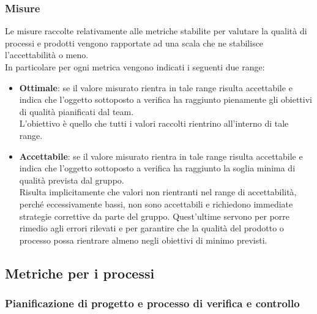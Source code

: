 		\subsubsection{Misure}
		Le misure raccolte relativamente alle metriche stabilite per valutare la qualità di processi e prodotti vengono rapportate ad una scala che ne stabilisce l'accettabilità o meno. \\In particolare per ogni metrica vengono indicati i seguenti due range:
			\begin{itemize}
				\item \textbf{Ottimale}: se il valore misurato rientra in tale range risulta accettabile e indica che l'oggetto sottoposto a verifica ha raggiunto pienamente gli obiettivi di qualità pianificati dal team. \\L'obiettivo è quello che tutti i valori raccolti rientrino all'interno di tale range.
				\item \textbf{Accettabile}: se il valore misurato rientra in tale range risulta accettabile e indica che l'oggetto sottoposto a verifica ha raggiunto la soglia minima di qualità prevista dal gruppo.
			\\Risulta implicitamente che valori non rientranti nel range di accettabilità, perché eccessivamente bassi, non sono accettabili e richiedono immediate strategie correttive da parte del gruppo. Quest'ultime servono per porre rimedio agli errori rilevati e per garantire che la qualità del prodotto o processo possa rientrare almeno negli obiettivi di minimo previsti.		
			\end{itemize}
	

		\subsection{Metriche per i processi}
		\subsubsection[Pianificazione di progetto e processo di verifica e controllo]{\hypertarget{pppvc}{Pianificazione di progetto e processo di verifica e controllo}}
